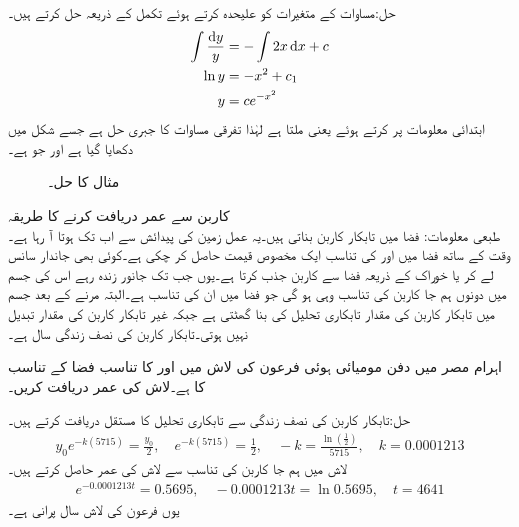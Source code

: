 حل:مساوات کے متغیرات کو علیحدہ کرتے ہوئے تکمل کے ذریعہ حل کرتے ہیں۔
\begin{align*}
\int\frac{\dif y}{y}&=-\int 2x \dif x+c\\
\ln y&=-x^{2}+c_1\\
y&=ce^{-x^2}
\end{align*}
ابتدائی معلومات پر کرتے ہوئے  یعنی  ملتا ہے لہٰذا تفرقی مساوات کا جبری حل  ہے جسے شکل  میں دکھایا گیا ہے اور جو  ہے۔
\begin{figure}
\centering
{}
\caption{مثال  کا  حل۔}
\label{شکل_مثال_سادہ_اول_گھنٹی_الف}
\end{figure}
\quad کاربن سے عمر دریافت کرنے کا طریقہ\\
طبعی معلومات:  فضا میں تابکار کاربن  بناتی ہیں۔یہ عمل زمین کی پیدائش سے اب تک ہوتا آ رہا ہے۔وقت کے ساتھ فضا میں  اور  کی تناسب ایک مخصوص قیمت حاصل کر چکی ہے۔کوئی بھی جاندار سانس لے کر یا خوراک کے ذریعہ فضا سے کاربن جذب  کرتا ہے۔یوں جب تک جانور زندہ رہے اس کی جسم میں دونوں ہم جا کاربن کی تناسب وہی ہو گی جو فضا میں ان کی تناسب ہے۔البتہ مرنے کے بعد جسم میں تابکار کاربن کی مقدار تابکاری تحلیل کی بنا گھٹتی ہے جبکہ غیر تابکار کاربن کی مقدار تبدیل نہیں ہوتی۔تابکار کاربن  کی نصف زندگی  سال ہے۔

اہرام مصر میں دفن مومیائی ہوئی فرعون کی لاش میں  اور  کا تناسب فضا کے تناسب کا  ہے۔لاش کی عمر دریافت کریں۔

حل:تابکار کاربن کی نصف زندگی سے تابکاری تحلیل کا مستقل  دریافت کرتے ہیں۔
\begin{align*}
y_0e^{-k(5715)}=\frac{y_0}{2}, \quad e^{-k(5715)}=\frac{1}{2}, \quad -k=\frac{\ln (\frac{1}{2})}{5715}, \quad k=0.0001213
\end{align*}
لاش میں ہم جا کاربن کی تناسب سے لاش کی عمر حاصل کرتے ہیں۔
\begin{align*}
e^{-0.0001213t}=0.5695,\quad -0.0001213t=\ln 0.5695,\quad t=4641
\end{align*}
یوں فرعون کی لاش  سال پرانی ہے۔

